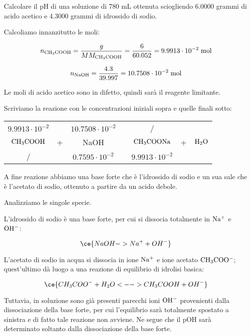 \begin{esercizio}
    Calcolare il pH di una soluzione di 780 mL ottenuta sciogliendo 6.0000 grammi di acido acetico e 4.3000 grammi di idrossido di sodio.
\end{esercizio}
\begin{soluzione}
    Calcoliamo innanzitutto le moli:

$$n_{\rm CH_3COOH}=\frac{g}{MM_{\rm CH_3COOH}}=\frac{6}{60.052}=9.9913 \cdot 10^{-2} \; \rm mol$$

$$n_{\rm NaOH}=\frac{4.3}{39.997}=10.7508 \cdot 10^{-2} \; \rm mol$$

Le moli di acido acetico sono in difetto, quindi sarà il reagente limitante.

Scriviamo la reazione con le concentrazioni iniziali sopra e quelle finali sotto:

\begin{center}
    \begin{tabular}{ccccccc}
        $9.9913 \cdot 10^{-2}$ & & $10.7508 \cdot 10^{-2}$ & & / &&\\
        $\rm CH_3COOH$ & + & NaOH & \ce{->} & $\rm CH_3COONa$ & + & $\rm H_2O$\\
        / & & $0.7595 \cdot 10^{-2}$ & & $9.9913 \cdot 10^{-2}$&&\\
    \end{tabular}
\end{center}

A fine reazione abbiamo una base forte che è l'idrossido di sodio e un sua sale che è l'acetato di sodio, ottenuto a partire da un acido debole.

Analizziamo le singole specie.

L'idrossido di sodio è una base forte, per cui si dissocia totalmente in $\rm Na^+$ e $\rm OH^-$:

\begin{equation*}
    \ce{NaOH -> Na^+ + OH^-}
\end{equation*}

L'acetato di sodio in acqua si dissocia in ione $\rm Na^+$ e ione acetato $\rm CH_3COO^-$; quest'ultimo dà luogo a una reazione di equilibrio di idrolisi basica:

\begin{equation*}
    \ce{CH_3COO^- + H_2O <--> CH_3COOH + OH^-}
\end{equation*}

Tuttavia, in soluzione sono già presenti parecchi ioni $\rm OH^-$ provenienti dalla dissociazione della base forte, per cui l'equilibrio sarà totalmente spostato a sinistra e di fatto tale reazione non avviene. Ne segue che il pOH sarà determinato soltanto dalla dissociazione della base forte.


\end{soluzione}

